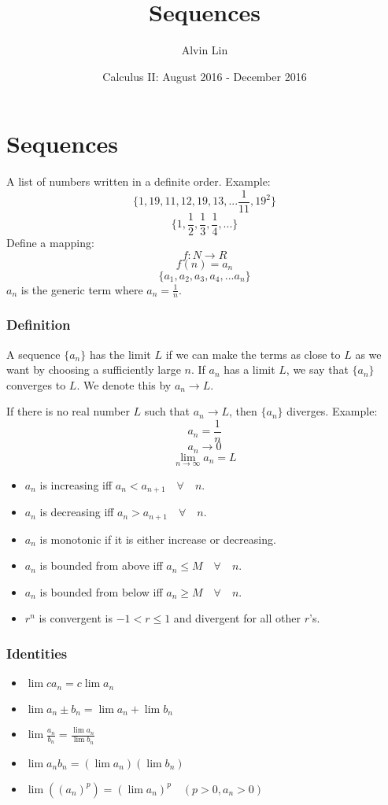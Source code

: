 \documentclass{math}
\title{Sequences}
\author{Alvin Lin}
\date{Calculus II: August 2016 - December 2016}
\begin{document}
\maketitle

\section*{Sequences}
A list of numbers written in a definite order. Example:
\[ \bigg\{1,19,11,12,19,13,...\frac{1}{11},19^{2}\bigg\} \]
\[ \bigg\{1,\frac{1}{2},\frac{1}{3},\frac{1}{4},...\bigg\} \]
Define a mapping:
\[ f:N \rightarrow R \]
\[ f(n) = a_{n} \]
\[ \bigg\{a_{1},a_{2},a_{3},a_{4},...a_{n}\bigg\} \]
\( a_{n} \) is the generic term where \( a_{n} = \frac{1}{n} \).

\subsubsection*{Definition}
A sequence \( \{a_{n}\} \) has the limit \( L \) if we can make the terms
as close to \( L \) as we want by choosing a sufficiently large \( n \). If
\( a_{n} \) has a limit \( L \), we say that \( \{a_{n}\} \) converges to
\( L \). We denote this by \( a_{n} \rightarrow L \). \par
If there is no real number \( L \) such that \( a_{n} \rightarrow L \),
then \( \{a_{n}\} \) diverges.
\newline
Example:
\[ a_{n} = \frac{1}{n} \]
\[ a_{n} \to 0 \]
\[ \lim_{n \to \infty}{a_{n}} = L \]
\begin{itemize}
  \item \( a_{n} \) is increasing iff
    \( a_{n}<a_{n+1} \quad \forall \quad n \).
  \item \( a_{n} \) is decreasing iff
    \( a_{n}>a_{n+1} \quad \forall \quad n \).
  \item \( a_{n} \) is monotonic if it is either increase or decreasing.
  \item \( a_{n} \) is bounded from above iff
    \( a_{n} \leq M \quad \forall \quad n \).
  \item \( a_{n} \) is bounded from below iff
    \( a_{n} \geq M \quad \forall \quad n \).
  \item \( r^{n} \) is convergent is \( -1 < r \leq 1 \) and divergent
    for all other \( r \)'s.
\end{itemize}

\subsubsection*{Identities}
\begin{itemize}
  \item \( \lim{ca_{n}} = c\lim{a_{n}} \)
  \item \( \lim{a_{n} \pm b_{n}} = \lim{a_{n}}+\lim{b_{n}} \)
  \item \( \lim{\frac{a_{n}}{b_{n}}} = \frac{\lim{a_{n}}}{\lim{b_{n}}} \)
  \item \( \lim{a_{n}b_{n}} = (\lim{a_{n}})(\lim{b_{n}}) \)
  \item \( \lim{((a_{n})^{p})} = (\lim{a_{n}})^{p} \quad (p>0,a_{n}>0) \)
\end{itemize}
\end{document}
